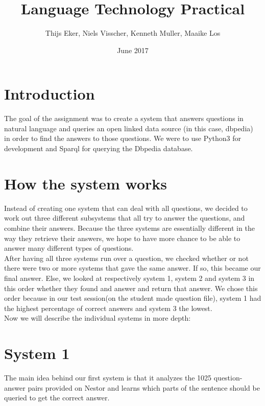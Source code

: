 \documentclass{article}
\title{Language Technology Practical}
\author{Thijs Eker, Niels Visscher, Kenneth Muller, Maaike Los }
\date{June 2017}
\begin{document}
\maketitle

\section{Introduction}

The goal of the assignment was to create a system that answers questions in natural language and queries an open linked data source (in this case, dbpedia) in order to find the answers to those questions. We were to use Python3 for development and Sparql for querying the Dbpedia database.

\section{How the system works}
Instead of creating one system that can deal with all questions, we decided to work out three different subsystems that all try to answer the questions, and combine their answers. Because the three systems are essentially different in the way they retrieve their answers, we hope to have more chance to be able to answer many different types of questions. \\
After having all three systems run over a question, we checked whether or not there were two or more systems that gave the same answer. If so, this became our final answer. Else, we looked at respectively system 1, system 2 and system 3 in this order whether they found and answer and return that answer. We chose this order because in our test session(on the student made question file), system 1 had the highest percentage of correct answers and system 3 the lowest.\\
Now we will describe the individual systems in more depth:

\section*{System 1}
The main idea behind our first system is that it analyzes the 1025 question-answer pairs provided on Nestor and learns which parts of the sentence should be queried to get the correct answer.
\end{document}
